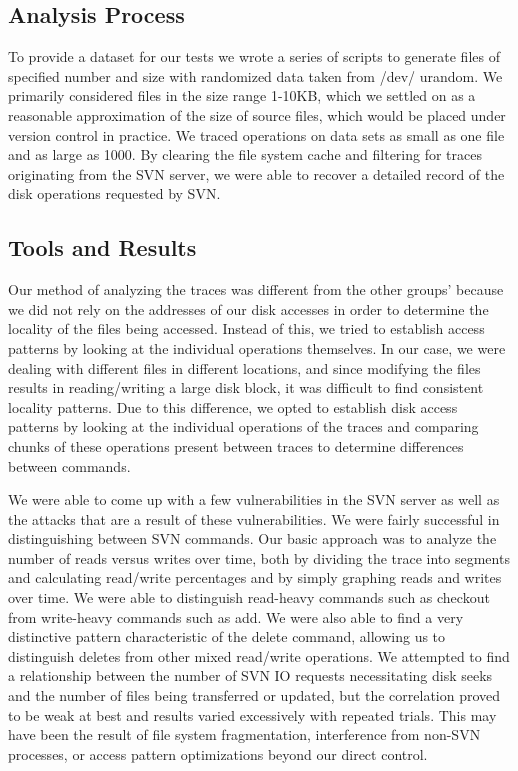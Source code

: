 \documentclass[11pt, oneside]{article}
\begin{document}
\subsection{Analysis Process}
To provide a dataset for our tests we wrote a series of scripts to generate 
files of specified number and size with randomized data taken from /dev/
urandom. We primarily considered files in the size range 1-10KB, which we 
settled on as a reasonable approximation of the size of source files, which 
would be placed under version control in practice. We traced operations on 
data sets as small as one file and as large as 1000. By clearing the file 
system cache and filtering for traces originating from the SVN server, we were 
able to recover a detailed record of the disk operations requested by SVN.
\subsection{Tools and Results}
Our method of analyzing the traces was different from the other groups’ 
because we did not rely on the addresses of our disk accesses in order to 
determine the locality of the files being accessed. Instead of this, we tried 
to establish access patterns by looking at the individual operations 
themselves.  In our case, we were dealing with different files in different 
locations, and since modifying the files results in reading/writing a large 
disk block, it was difficult to find consistent locality patterns. Due to this 
difference, we opted to establish disk access patterns by looking at the 
individual operations of the traces and comparing chunks of these operations 
present between traces to determine differences between commands.

We were able to come up with a few vulnerabilities in the SVN server as well 
as the attacks that are a result of these vulnerabilities. We were fairly 
successful in distinguishing between SVN commands. Our basic approach was to 
analyze the number of reads versus writes over time, both by dividing the 
trace into segments and calculating read/write percentages and by simply 
graphing reads and writes over time. We were able to distinguish read-heavy 
commands such as checkout from write-heavy commands such as add. We were also 
able to find a very distinctive pattern characteristic of the delete command, 
allowing us to distinguish deletes from other mixed read/write operations. We 
attempted to find a relationship between the number of SVN IO requests 
necessitating disk seeks and the number of files being transferred or updated, 
but the correlation proved to be weak at best and results varied excessively 
with repeated trials. This may have been the result of file system 
fragmentation, interference from non-SVN processes, or access pattern 
optimizations beyond our direct control.
\end{document}
